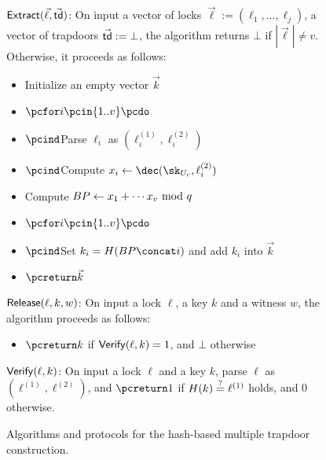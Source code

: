 \begin{figure*}[htb]
\begin{center}
{\begin{minipage}[t]{0.75\textwidth}
			\underline{$\mathsf{Extract}(\vec{\ell}, \vec{\mathsf{td}})$}: On input a vector of locks 
			$\vec{\ell} := (\ell_1,\ldots,\ell_j)$, a vector of trapdoors $\vec{\mathsf{td}} := \bot$, 
			the algorithm returns $\bot$ if $|\vec{\ell}| \neq v$. Otherwise, it proceeds as 
			follows:
			\begin{itemize}[label=-]
				\item Initialize an empty vector $\vec{k}$
				\item $\pcfor i \pcin \{1..v\} \pcdo$
				\item $\pcind$Parse $\ell_i$ as $(\ell_i^{(1)},\ell_i^{(2)})$
				\item $\pcind$Compute $x_i \gets \dec(\sk_{U_r},\ell_i^{(2)})$
				\item Compute $BP \gets x_1 + \cdots x_v \ \mathrm{mod}\ q$
				\item $\pcfor i \pcin \{1..v\} \pcdo$
				\item $\pcind$Set $k_i = H(BP \concat i)$ and add $k_i$ into 
				$\vec{k}$
				\item $\pcreturn \vec{k}$
			\end{itemize}
			\underline{$\mathsf{Release}(\ell, k, w)$}: On input a lock $\ell$, a key $k$ and 
			a witness $w$, the algorithm proceeds as follows:
			\begin{itemize}[label=-]
				\item $\pcreturn k$ if $\mathsf{Verify}(\ell, k) = 1$, and $\bot$ otherwise
			\end{itemize}
			\underline{$\mathsf{Verify}(\ell, k)$}: On input a lock $\ell$ and a key $k$, 
			parse $\ell$ as $(\ell^{(1)},\ell^{(2)})$, and $\pcreturn 1$ if $H(k) \stackrel{?}{=} 
			\ell^{(1)}$ holds, and 0 otherwise.
		\end{minipage}
	}
	\end{center}
	
	\caption{Algorithms and protocols for the hash-based multiple trapdoor construction.}
	\label{fig:single-trapdoor}
\end{figure*}

